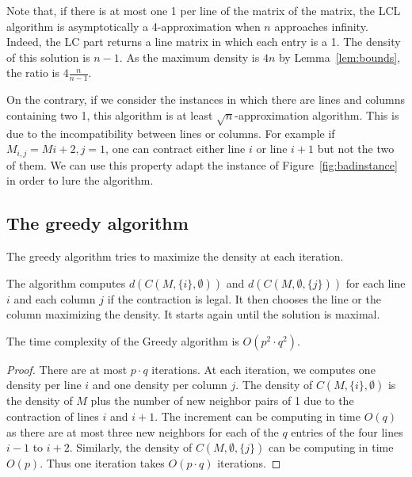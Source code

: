\begin{remark}
	Note that, if there is at most one 1 per line of the matrix of the matrix, the LCL algorithm is asymptotically a 4-approximation when $n$ approaches infinity. Indeed, the LC part returns a line matrix in which each entry is a 1. The density of this solution is $n-1$. As the maximum density is $4n$ by Lemma~\ref{lem:bounds}, the ratio is $4\frac{n}{n-1}$. 
\end{remark} 

\begin{remark}
	On the contrary, if we consider the instances in which there are lines and columns containing two 1, this algorithm is at least $\sqrt{n}$-approximation algorithm. This is due to the incompatibility between lines or columns. For example if $M_{i,j} = M{i+2,j} = 1$, one can contract either line $i$ or line $i+1$ but not the two of them. We can use this property adapt the instance of Figure~\ref{fig:badinstance} in order to lure the algorithm.
\end{remark}

\subsection{The greedy algorithm}

The greedy algorithm tries to maximize the density at each iteration. 

The algorithm computes $d(C(M,\{i\},\emptyset))$ and $d(C(M,\emptyset, \{j\}))$ for each line $i$ and each column $j$ if the contraction is legal. It then chooses the line or the column maximizing the density. It starts again until the solution is maximal.

\begin{theorem}
	The time complexity of the Greedy algorithm is $O(p^2 \cdot q^2)$. 
\end{theorem}
\begin{proof}
	There are at most $p \cdot q$ iterations. At each iteration, we computes one density per line $i$ and one density per column $j$. The density of $C(M,\{i\},\emptyset)$ is the density of $M$ plus the number of new neighbor pairs of 1 due to the contraction of lines $i$ and $i+1$. The increment can be computing in time $O(q)$ as there are at most three new neighbors for each of the $q$ entries of the four lines $i-1$ to $i+2$. Similarly, the density of $C(M,\emptyset,\{j\})$ can be computing in time $O(p)$. Thus one iteration takes $O(p \cdot q)$ iterations. 
\end{proof}

